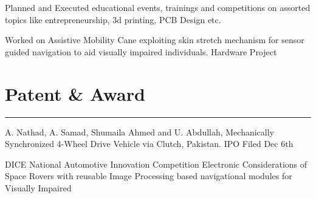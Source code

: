 \documentclass[]{ShumailaAhmed-Resume}
\begin{document}
\begin{minipage}[t]{0.66\textwidth}
 
\noindent
\hspace{5em}%
\begin{minipage}{0.85\textwidth\vspace{2pt}}
Planned and Executed educational events, trainings and competitions on assorted topics like entrepreneurship, 3d printing, PCB Design etc.  
\end{minipage}
\sectionsep

 
\noindent
\hspace{5em}%
\begin{minipage}{0.85\textwidth\vspace{2pt}}
Worked on Assistive Mobility Cane exploiting skin stretch mechanism for sensor guided navigation to aid visually impaired individuals. Hardware Project
\end{minipage}
\section{Patent \& Award} 
\noindent\rule{12.5cm}{0.4pt}
 \runsubsection{}
\noindent
\hspace{5em}%
\begin{minipage}{0.85\textwidth\vspace{2pt}}
A. Nathad, A. Samad, Shumaila Ahmed and U. Abdullah, Mechanically
Synchronized 4-Wheel Drive Vehicle via Clutch, Pakistan.
IPO Filed Dec 6th\end{minipage}
 \runsubsection{}
\noindent
\hspace{5em}%
\begin{minipage}{0.85\textwidth\vspace{2pt}}
DICE National Automotive Innovation Competition
Electronic Considerations of Space Rovers with reusable Image Processing
based navigational modules for Visually Impaired
\end{minipage}


\end{minipage}
\end{document}
